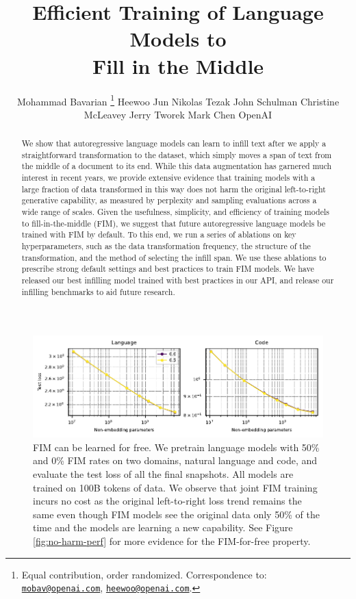 \documentclass[postscript]{article}
\title{Efficient Training of Language Models to \\ Fill in the Middle}
\author{
Mohammad Bavarian \thanks{Equal contribution, order randomized. Correspondence to: \href{mailto:mobav@openai.com}{\nolinkurl{mobav@openai.com}}, \href{mailto:heewoo@openai.com}{\nolinkurl{heewoo@openai.com}}.}
\And
Heewoo Jun\footnotemark[1]
\And
Nikolas Tezak
\AND
John Schulman
\And 
Christine McLeavey
\And
Jerry Tworek
 \And
Mark Chen
\AND
{\normalfont\large OpenAI}
}
\begin{document}
\maketitle

\begin{abstract}
We show that autoregressive language models can learn to infill text after we apply a straightforward transformation to the dataset, which simply moves a span of text from the middle of a document to its end. While this data augmentation has garnered much interest in recent years, we provide extensive evidence that training models with a large fraction of data transformed in this way does not harm the original left-to-right generative capability, as measured by perplexity and sampling evaluations across a wide range of scales. Given the usefulness, simplicity, and efficiency of training models to fill-in-the-middle (FIM), we suggest that future autoregressive language models be trained with FIM by default. To this end, we run a series of ablations on key hyperparameters, such as the data transformation frequency, the structure of the transformation, and the method of selecting the infill span. We use these ablations to prescribe strong default settings and best practices to train FIM models. We have released our best infilling model trained with best practices in our API, and release our infilling benchmarks to aid future research.
\clearpage
\end{abstract}

\begingroup
\small
\hypersetup{linkcolor=black, colorlinks=True}
\tableofcontents
\endgroup

\begin{figure}[ht!]
\centering
\includegraphics[width=\textwidth]{figures/final-loss-vs-compute.pdf}
\caption{FIM can be learned for free. We pretrain language models with 50\% and 0\% FIM rates on two domains, natural language and code, and evaluate the test loss of all the final snapshots. All models are trained on 100B tokens of data. We observe that joint FIM training incurs no cost as the original left-to-right loss trend remains the same even though FIM models see the original data only 50\% of the time and the models are learning a new capability. See Figure \ref{fig:no-harm-perf} for more evidence for the FIM-for-free property.}
\label{fig:no-harm-perp}
\end{figure}
\end{document}
